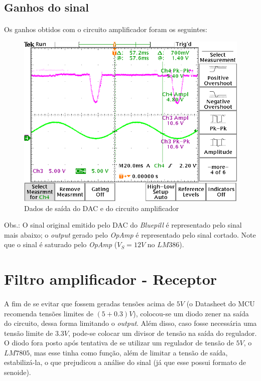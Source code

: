 \documentclass[12pt,a4paper]{report}
\begin{document}
		
	\subsection{Ganhos do sinal}
		\paragraph{} Os ganhos obtidos com o circuito amplificador foram os seguintes:\\
		
		\begin{figure}[h]
			\centering
			\includegraphics[width=\linewidth]{TEK00003.png}
			\caption{Dados de saída do DAC e do circuito amplificador}
			\label{fig:gainz}
		\end{figure}
	
		Obs.: O sinal original emitido pelo DAC do {\it Bluepill} é representado pelo sinal mais abaixo; o {\it output} gerado pelo {\it OpAmp} é representado pelo sinal cortado. Note que o sinal é saturado pelo {\it OpAmp} ($V_S = 12V$ no $LM386$).
		
		
	\section{Filtro amplificador - Receptor}
		\paragraph{} A fim de se evitar que fossem geradas tensões acima de $5V$ (o Datasheet do MCU recomenda tensões limites de $(5+0.3)V$), colocou-se um diodo zener na saída do circuito, dessa forma limitando o {\it output}. Além disso, caso fosse necessária uma tensão limite de $3.3V$, pode-se colocar um divisor de tensão na saída do regulador. O diodo fora posto após tentativa de se utilizar um regulador de tensão de $5V$, o $LM7805$, mas esse tinha como função, além de limitar a tensão de saída, estabilizá-la, o que prejudicou a análise do sinal (já que esse possui formato de senoide).\\
		
\end{document}
